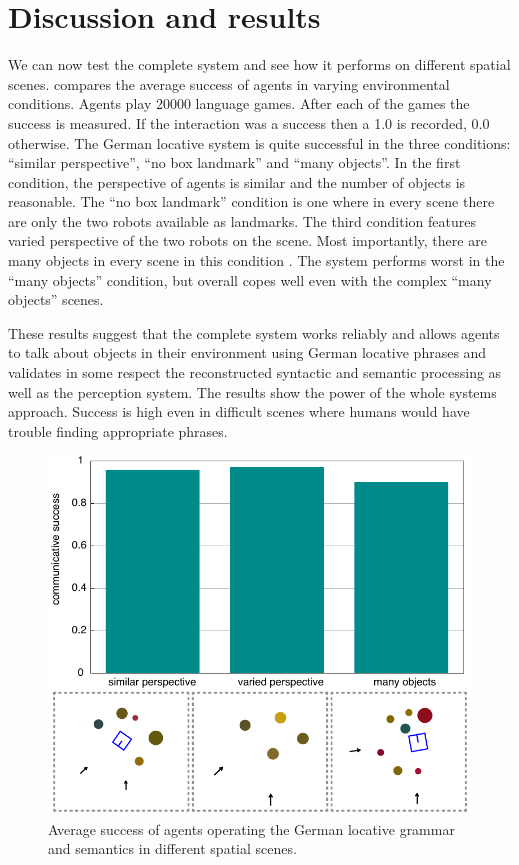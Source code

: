 \section{Discussion and results}
\label{s:syntax+semantics-integration}
We can now test the complete system and see how it performs
on different spatial scenes.  compares the average success 
of agents in varying environmental conditions. Agents play 20000 language
games. After each of the games the success is measured. If the interaction 
was a success then a 1.0 is recorded, 0.0 otherwise. The German locative system 
is quite successful in the three conditions: ``similar perspective'', 
``no box landmark'' and ``many objects''. In the first condition, the 
perspective of agents is similar and the number of objects is reasonable.
The ``no box landmark'' condition is one where in every scene there are only the two
robots available as landmarks. The third condition features varied perspective of the two
robots on the scene. Most importantly, there are many objects in every scene in this condition .
The system performs worst in the ``many objects'' condition, but overall copes 
well even with the complex ``many objects'' scenes.

These results suggest that the complete system works reliably and allows agents
to talk about objects in their environment using German locative phrases and
validates in some respect the reconstructed syntactic and semantic processing 
as well as the perception system. The results show the power of the whole systems approach.
Success is high even in difficult scenes where humans would have trouble finding appropriate
phrases.

\begin{figure}
\begin{center}
\includegraphics[width=.8\columnwidth]{figs/results-german-grammar}
\end{center}
\caption[Average success of agents operating the German locative system]{%
Average success of agents operating the German locative grammar
and semantics in different spatial scenes.}
\label{f:interpretations-2}
\end{figure}


%
% 
%